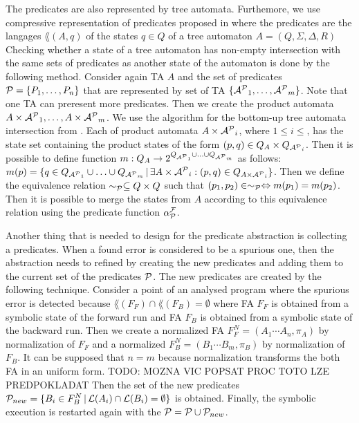 The predicates are also represented by tree automata.
Furthemore, we use compressive representation of predicates
proposed in \cite{artmc} where the predicates are the langages $\lang(A,q)$
of the states $q \in Q$ of a tree automaton $A=(Q,\Sigma,\Delta, R)$
Checking whether a state of a tree automaton has non-empty intersection
with the same sets of predicates as another state of the automaton is done by the following method.
Consider again TA $A$ and the set of predicates $\mathcal{P} = \{P_1, \ldots, P_n\}$
that are represented by set of TA $\{\mathcal{A^P}_1, \ldots, \mathcal{A^P}_m\}$.
Note that one TA can preresent more predicates.
Then we create the product automata $A \times \mathcal{A^P}_1, \ldots, A \times \mathcal{A^P}_m$.
We use the algorithm for the bottom-up tree automata intersection from \cite{mt:lengal}.
Each of product automata $A \times \mathcal{A^P}_i$, where $1 \leq i \leq$, has the state set
containing the product states of the form $(p,q) \in Q_A \times Q_{\mathcal{A^P}_i}$.
Then it is possible to define function $m: Q_A \rightarrow 2^{Q_{\mathcal{A^P}_1} \cup \ldots
\cup Q_{\mathcal{A^P}_m}}$ as follows: $m(p) = \{q \in Q_{\mathcal{A^P}_1} \cup \ldots \cup Q_{\mathcal{A^P}_m}\,|\,
\exists A \times \mathcal{A^P}_i: (p,q) \in Q_{A \times \mathcal{A^P}_i}\}$.
Then we define the equivalence relation $\sim_{\mathcal{P}} \subseteq Q \times Q$
such that $(p_1,p_2) \in \sim_{\mathcal{P}} \Leftrightarrow m(p_1) = m(p_2)$.
Then it is possible to merge the states from $A$ according to this equivalence relation
using the predicate function $\alpha_{\mathcal{P}}^{\mathcal{F}}$.

Another thing that is needed to design for the predicate abstraction is collecting a predicates.
When a found error is considered to be a spurious one, then the abstraction needs to refined
by creating the new predicates and adding them to the current set of the predicates $\mathcal{P}$.
The new predicates are created by the following technique.
Consider a point of an analysed program where the spurious error is detected
because $\lang(F_F) \cap \lang(F_B) = \emptyset$ where FA $F_F$ is obtained
from a symbolic state of the forward run and FA $F_B$ is obtained from a symbolic state of
the backward run.
Then we create a normalized FA $F_F^N = (A_1 \cdots A_n, \pi_A)$ by normalization of $F_F$
and a normalized $F_B^N = (B_1 \cdots B_m, \pi_B)$ by normalization of $F_B$.
It can be supposed that $n = m$ because normalization transforms the both FA in an uniform form.
TODO: MOZNA VIC POPSAT PROC TOTO LZE PREDPOKLADAT
Then the set of the new predicates $\mathcal{P}_{new} = \{B_i \in F^N_B \,|\, \mathcal{L}(A_i) \cap \mathcal{L}(B_i) =
\emptyset\}$ is obtained.
Finally, the symbolic execution is restarted again with the $\mathcal{P} = \mathcal{P} \cup \mathcal{P}_{new}$.

